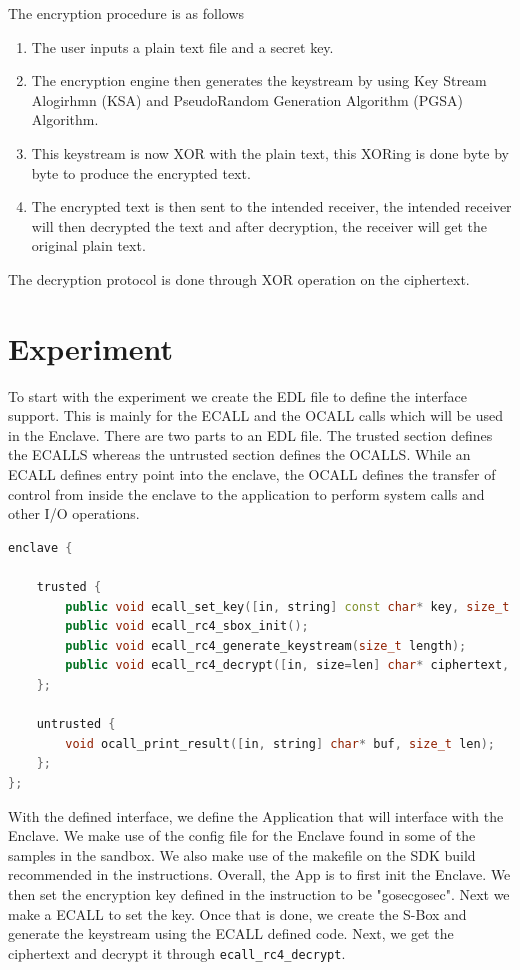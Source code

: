 \documentclass{article}
\newcommand{\code}[1]{\lstinline|#1|}
\begin{document}
The encryption procedure is as follows

\begin{enumerate}
      \item The user inputs a plain text file and a secret key.
      \item The encryption engine then generates the keystream by using Key Stream
            Alogirhmn (KSA) and PseudoRandom Generation Algorithm (PGSA) Algorithm.
      \item This keystream is now XOR with the plain text, this XORing is done byte by byte
            to produce the encrypted text.
      \item The encrypted text is then sent to the intended receiver, the intended receiver
            will then decrypted the text and after decryption, the receiver will get the
            original plain text.
\end{enumerate}

The decryption protocol is done through XOR operation on the ciphertext.

\section*{Experiment}

To start with the experiment we create the EDL file to define the interface
support. This is mainly for the ECALL and the OCALL calls which will be used in
the Enclave. There are two parts to an EDL file. The trusted section defines
the ECALLS whereas the untrusted section defines the OCALLS. While an ECALL
defines entry point into the enclave, the OCALL defines the transfer of control
from inside the enclave to the application to perform system calls and other
I/O operations.

\begin{lstlisting}[language=c++]
enclave {

    trusted {
        public void ecall_set_key([in, string] const char* key, size_t len);
        public void ecall_rc4_sbox_init();
        public void ecall_rc4_generate_keystream(size_t length);
        public void ecall_rc4_decrypt([in, size=len] char* ciphertext, size_t len);
    };

    untrusted {
        void ocall_print_result([in, string] char* buf, size_t len);
    };
};
\end{lstlisting}

With the defined interface, we define the Application that will interface with
the Enclave. We make use of the config file for the Enclave found in some of
the samples in the sandbox. We also make use of the makefile on the SDK build
recommended in the instructions. Overall, the App is to first init the Enclave.
We then set the encryption key defined in the instruction to be "gosecgosec".
Next we make a ECALL to set the key. Once that is done, we create the S-Box and
generate the keystream using the ECALL defined code. Next, we get the
ciphertext and decrypt it through \code{ecall_rc4_decrypt}.
\end{document}

